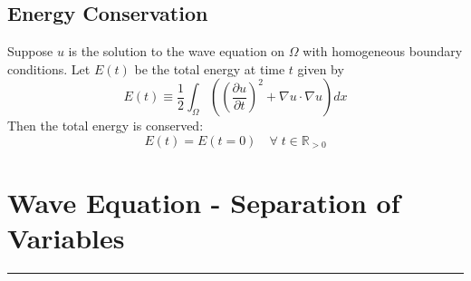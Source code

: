 \documentclass[11pt]{article}
\newcommand{\R}{\mathbb{R}}
\begin{document}
\subsection{Energy Conservation}
Suppose $u$ is the solution to the wave equation on $\Omega$ with homogeneous boundary conditions.  Let $E(t)$ be the total energy at time $t$ given by
$$ E(t) \equiv \frac{1}{2} \int_{\Omega} \left( \left( \frac{\partial u}{\partial t} \right)^2  + \nabla u \cdot \nabla u \right) dx$$
Then the total energy is conserved:
$$ E(t) = E(t=0) \quad \forall \; t \in \R_{>0} $$


\pagebreak

\section{Wave Equation - Separation of Variables }
\hrule \vspace{15pt}
\end{document}
